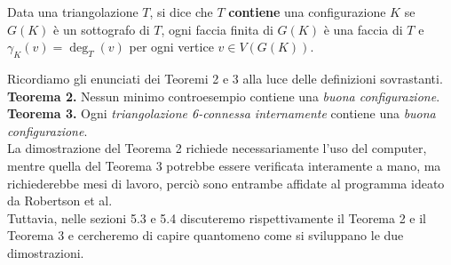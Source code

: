 \documentclass[a4paper,12pt,titlepage]{report}
\begin{document}
    \begin{dfn}
    	Data una triangolazione $T$, si dice che $T$ {\bfseries contiene} una configurazione $K$ se $G(K)$ è un sottografo di $T$, ogni faccia finita di $G(K)$ è una faccia di $T$ e $\gamma_K(v) = \deg_T(v)$ per ogni vertice $v \in V(G(K))$.
    \end{dfn}
    Ricordiamo gli enunciati dei Teoremi 2 e 3 alla luce delle definizioni sovrastanti.
    \vspace{0.5cm}
    \\{\bfseries Teorema 2.} Nessun minimo controesempio contiene una \emph{buona configurazione}.
    \\{\bfseries Teorema 3.} Ogni \emph{triangolazione 6-connessa internamente} contiene una \emph{buona configurazione}.
    \vspace{0.5cm}
    \\La dimostrazione del Teorema 2 richiede necessariamente l'uso del computer, mentre quella del Teorema 3 potrebbe essere verificata interamente a mano, ma richiederebbe mesi di lavoro, perciò sono entrambe affidate al programma ideato da Robertson et al.
    \\Tuttavia, nelle sezioni 5.3 e 5.4 discuteremo rispettivamente il Teorema 2 e il Teorema 3 e cercheremo di capire quantomeno come si sviluppano le due dimostrazioni.
    
\end{document}

